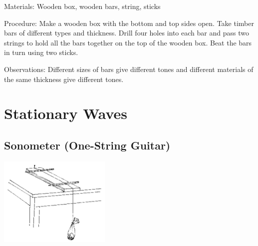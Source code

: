 \begin{multicols}{2}
\begin{description*}
\item[Materials:]{Wooden box, wooden bars, string, sticks}
\item[Procedure:]{Make a wooden box with the bottom and top sides open. Take timber bars of different types and thickness. Drill four holes into each bar and pass two strings to hold all the bars together on the top of the wooden box. Beat the bars in turn using two sticks.}
\item[Observations:]{Different sizes of bars give different tones and different materials of the same thickness give different tones.}
\end{description*}


\section*{Stationary Waves}


\subsection{Sonometer (One-String Guitar)}

\begin{center}
\includegraphics[width=0.4\textwidth]{./img/source/sonometer.png}
\end{center}


\end{multicols}
